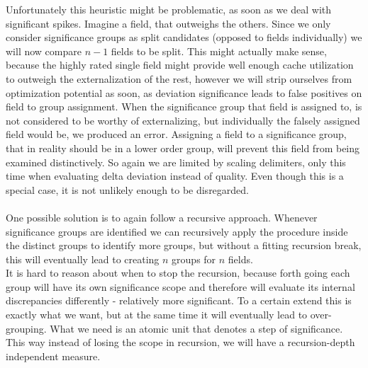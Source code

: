 Unfortunately this heuristic might be problematic, as soon as we deal with significant spikes. Imagine a field, that outweighs the others. Since we only consider significance groups as split candidates (opposed to fields individually) we will now compare $n-1$ fields to be split. This might actually make sense, because the highly rated single field might provide well enough cache utilization to outweigh the externalization of the rest, however we will strip ourselves from optimization potential as soon, as deviation significance leads to false positives on field to group assignment. When the significance group that field is assigned to, is not considered to be worthy of externalizing, but individually the falsely assigned field would be, we produced an error. Assigning a field to a significance group, that in reality should be in a lower order group, will prevent this field from being examined distinctively. So again we are limited by scaling delimiters, only this time when evaluating delta deviation instead of quality. Even though this is a special case, it is not unlikely enough to be disregarded.\\\\
One possible solution is to again follow a recursive approach. Whenever significance groups are identified we can recursively apply the procedure inside the distinct groups to identify more groups, but without a fitting recursion break, this will eventually lead to creating $n$ groups for $n$ fields.\\
It is hard to reason about when to stop the recursion, because forth going each group will have its own significance scope and therefore will evaluate its internal discrepancies differently - relatively more significant. To a certain extend this is exactly what we want, but at the same time it will eventually lead to over-grouping. What we need is an atomic unit that denotes a step of significance. This way instead of losing the scope in recursion, we will have a recursion-depth independent measure.

